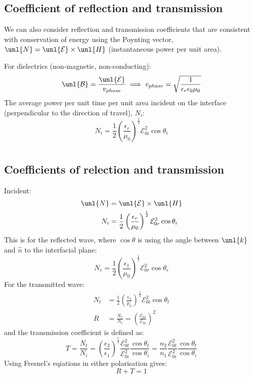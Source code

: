 \documentclass[a4paper, 11pt, normalem]{report}
\newcommand\E{\mathcal{E}}
\newcommand\uE{\unl{\E}}
\newcommand\B{\mathcal{B}}
\newcommand\uB{\unl{\B}}
\newcommand\eno{\epsilon_0}
\newcommand\hn{\hat{n}}
\newcommand\vk{\unl{k}}
\newcommand\er{\epsilon_r}
\newcommand\e{\epsilon}
\begin{document}
\section{Coefficient of reflection and transmission}
We can also consider reflection and transmission coefficients that are consistent with conservation of energy using the Poynting vector, $\unl{N} = \uE \times \unl{H}$ (instantaneous power per unit area).

For dielectrics (non-magnetic, non-conducting):
\begin{equation}
	\uB = \frac{\uE}{v_{phase}} \implies v_{phase} = \sqrt{\frac{1}{\er\eno\mu_0}}
\end{equation}
The average power per unit time per unit area incident on the interface (perpendicular to the direction of travel), $N_i$:
\begin{equation}
	N_i = \frac{1}{2}\left(\frac{\er}{\mu_0}\right)^{\frac{1}{2}} \E_{0i}^2\cos\theta_i
\end{equation}

\chapter{}
\section{Coefficients of relection and transmission}
Incident:
\begin{align}
	\unl{N} &= \uE \times \unl{H} \\
	N_i &= \frac{1}{2}\left(\frac{\er}{\mu_0}\right)^{\frac{1}{2}} \E_{0r}^2\cos\theta_i
\end{align}
This is for the reflected wave, where $\cos\theta$ is using the angle between $\vk$ and $\hn$ to the interfacial plane:
\begin{equation}
	N_r = \frac{1}{2}\left(\frac{\e_1}{\mu_0}\right)^{\frac{1}{2}} \E_{0r}^2\cos\theta_r
\end{equation}
For the transmitted wave:
\begin{align}
	N_t &= \frac{1}{2}\left(\frac{\e_2}{\mu_0}\right)^{\frac{1}{2}} \E_{0t}^2\cos\theta_t \\
	R &= \frac{N_r}{N_i} = \left(\frac{\E_{0r}}{\E_{0i}}\right)^2
\end{align}
and the transmission coefficient is defined as:
\begin{equation}
	T = \frac{N_t}{N_i} = \left(\frac{\e_2}{\e_1}\right)^{\frac{1}{2}}\frac{\E_{0t}^2}{\E_{0i}^2} \frac{\cos\theta_t}{\cos\theta_i} = \frac{n_2}{n_1}\frac{\E_{0t}^2}{\E_{0i}^2} \frac{\cos\theta_t}{\cos\theta_i}
\end{equation}
Using Fresnel's eqiations in either polarisation gives:
\begin{equation}
	R + T = 1
\end{equation}
\end{document}
